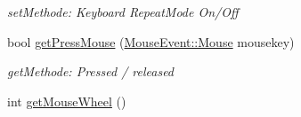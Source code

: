 \begin{DoxyCompactItemize}
\begin{DoxyCompactList}\small\item\em setMethode: Keyboard RepeatMode On/Off \item\end{DoxyCompactList}\item 
bool \hyperlink{class_f2_c_1_1_input_a9f6ddd6c1cb000651956d4778bf5ed11}{getPressMouse} (\hyperlink{namespace_f2_c_1_1_mouse_event_ad51c859ddf42f97a3c31fb60c21821a8}{MouseEvent::Mouse} mousekey)
\begin{DoxyCompactList}\small\item\em getMethode: Pressed / released \item\end{DoxyCompactList}\item 
\hypertarget{class_f2_c_1_1_input_ad5735b5ece3cb4647543261fdca31f25}{
int \hyperlink{class_f2_c_1_1_input_ad5735b5ece3cb4647543261fdca31f25}{getMouseWheel} ()}
\label{class_f2_c_1_1_input_ad5735b5ece3cb4647543261fdca31f25}


\end{DoxyCompactItemize}
